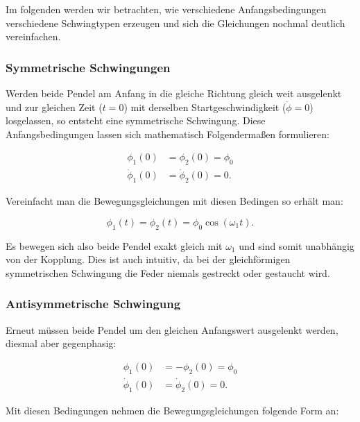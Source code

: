 \documentclass{article}
\begin{document}
Im folgenden werden wir betrachten, wie verschiedene Anfangsbedingungen verschiedene Schwingtypen erzeugen und sich die Gleichungen nochmal deutlich vereinfachen.

\subsubsection{Symmetrische Schwingungen}

Werden beide Pendel am Anfang in die gleiche Richtung gleich weit ausgelenkt und zur gleichen Zeit ($t = 0$) mit derselben Startgeschwindigkeit ($\dot{\phi} = 0$) losgelassen, so entsteht eine symmetrische Schwingung. Diese Anfangsbedingungen lassen sich mathematisch Folgendermaßen formulieren:

\begin{equation}
    \begin{split}
        \phi_1 (0) &= \phi_2 (0) = \phi_0 \\
        \dot{\phi}_1 (0) &= \dot{\phi}_2 (0) = 0.
    \end{split}
\end{equation}

Vereinfacht man die Bewegungsgleichungen mit diesen Bedingen so erhält man:

\begin{equation}
    \phi_1(t) = \phi_2(t) = \phi_0 \cos{(\omega_1 t)}.
    \label{eq:EOMsymm}
\end{equation}

Es bewegen sich also beide Pendel exakt gleich mit $\omega_1$ und sind somit unabhängig von der Kopplung. Dies ist auch intuitiv, da bei der gleichförmigen symmetrischen Schwingung die Feder niemals gestreckt oder gestaucht wird.

\subsubsection{Antisymmetrische Schwingung}

Erneut müssen beide Pendel um den gleichen Anfangswert ausgelenkt werden, diesmal aber gegenphasig:

\begin{equation}
    \begin{split}
        \phi_1 (0) &= -\phi_2 (0) = \phi_0 \\
        \dot{\phi}_1 (0) &= \dot{\phi}_2 (0) = 0.
    \end{split}
\end{equation}

Mit diesen Bedingungen nehmen die Bewegungsgleichungen folgende Form an:
\end{document}
